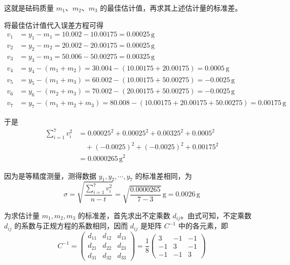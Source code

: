 \documentclass[UTF8,zihao=-4]{ctexart}
\begin{document}
这就是砝码质量 $m_1$、$m_2$、$m_3$ 的最佳估计值，再求其上述估计量的标准差。

将最佳估计值代入误差方程可得
\begin{equation*}
\begin{aligned}
    v_1&=y_1-m_1=10.002-10.00175=0.00025\,\mathrm{g}\\
    v_2&=y_2-m_2=20.002-20.00175=0.00025\,\mathrm{g}\\
    v_3&=y_3-m_3=50.006-50.00275=0.00325\,\mathrm{g}\\
    v_4&=y_4-(m_1+m_2)=30.004-(10.00175+20.00175)=0.0005\,\mathrm{g}\\
    v_5&=y_5-(m_1+m_3)=60.002-(10.00175+50.00275)=-0.0025\,\mathrm{g}\\
    v_6&=y_6-(m_2+m_3)=70.002-(20.00175+50.00275)=-0.0025\,\mathrm{g}\\
    v_7&=y_7-(m_1+m_2+m_3)=80.008-(10.00175+20.00175+50.00275)=0.00175\,\mathrm{g}
\end{aligned}
\end{equation*}

于是
\begin{equation*}
\begin{aligned}
    \sum_{i=1}^{7}v_i^2
    &=
    0.00025^2+0.00025^2+0.00325^2+0.0005^2\\
    &\quad
    +(-0.0025)^2+(-0.0025)^2+0.00175^2\\
    &=
    0.0000265\,\mathrm{g}^2
\end{aligned}
\end{equation*}

因为是等精度测量，测得数据 $y_1,y_2,\cdots,y_7$ 的标准差相同，为
\begin{equation*}
    \sigma
    =
    \sqrt{
    \frac{\displaystyle\sum_{i=1}^{7}v_i^2}{n-t}
    }
    =
    \sqrt{\frac{0.0000265}{7-3}}\,\mathrm{g}
    =
    0.0026\,\mathrm{g}
\end{equation*}

为求估计量 $m_1,m_2,m_3$ 的标准差，首先求出不定乘数 $d_{ij}$。由式可知，不定乘数 $d_{ij}$ 的系数与正规方程的系数相同，因而 $d_{ij}$ 是矩阵 $C^{-1}$ 中的各元素，即
\begin{equation*}
    C^{-1}
    =
    \begin{pmatrix}
        d_{11} & d_{12} & d_{13}\\
        d_{21} & d_{22} & d_{23}\\
        d_{31} & d_{32} & d_{33}
    \end{pmatrix}
    =
    \frac{1}{8}
    \begin{pmatrix}
        3 & -1 & -1\\
        -1 & 3 & -1\\
        -1 & -1 & 3
    \end{pmatrix}
\end{equation*}
\end{document}
